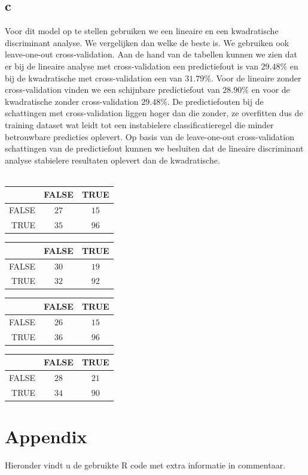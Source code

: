 \documentclass[11pt, a4paper]{article}
\begin{document}
\subsection*{c}
Voor dit model op te stellen gebruiken we een lineaire en een kwadratische discriminant analyse. We vergelijken dan welke de beste is. We gebruiken ook leave-one-out cross-validation. Aan de hand van de tabellen kunnen we zien dat er bij de lineaire analyse met cross-validation een predictiefout is van $29.48\%$ en bij de kwadratische met cross-validation een van $31.79\%$. Voor de lineaire zonder cross-validation vinden we een schijnbare predictiefout van $28.90\%$ en voor de kwadratische zonder cross-validation $29.48\%$. De predictiefouten bij de schattingen met cross-validation liggen hoger dan die zonder, ze overfitten dus de training dataset wat leidt tot een instabielere classificatieregel die minder betrouwbare predicties oplevert. Op basis van de leave-one-out cross-validation schattingen van de predictiefout kunnen we besluiten dat de lineaire discriminant analyse stabielere resultaten oplevert dan de kwadratische.
\\\\
\begin{center}
\begin{tabular}{r|c|c}
&FALSE&TRUE\\
\hline
FALSE&$27$&$15$\\
\hline
TRUE&$35$&$96$\\
\end{tabular}

\begin{tabular}{r|c|c}
&FALSE&TRUE\\
\hline
FALSE&$30$&$19$\\
\hline
TRUE&$32$&$92$\\
\end{tabular}

\begin{tabular}{r|c|c}
&FALSE&TRUE\\
\hline
FALSE&$26$&$15$\\
\hline
TRUE&$36$&$96$\\
\end{tabular}

\begin{tabular}{r|c|c}
&FALSE&TRUE\\
\hline
FALSE&$28$&$21$\\
\hline
TRUE&$34$&$90$\\
\end{tabular}
\end{center}
\newpage
\section*{Appendix}
Hieronder vindt u de gebruikte R code met extra informatie in commentaar. 
\begin{framed}

\end{framed}
\end{document}
